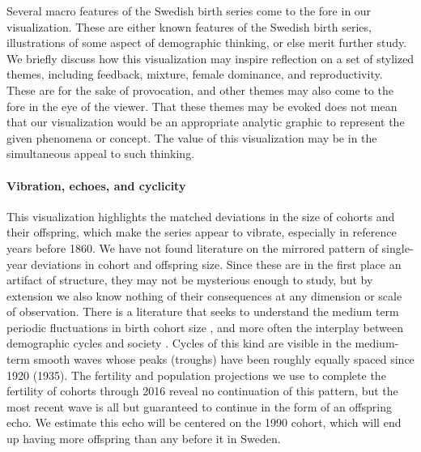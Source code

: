 
Several macro features of the Swedish birth series come to the fore in our visualization. These are either known features of the Swedish birth series, illustrations of some aspect of demographic thinking, or else merit further study. We briefly discuss how this visualization may inspire reflection on a set of stylized themes, including  feedback, mixture, female dominance, and reproductivity. These are for the sake of provocation, and other themes may also come to the fore in the eye of the viewer. That these themes may be evoked does not mean that our visualization would be an appropriate analytic graphic to represent the given phenomena or concept. The value of this visualization may be in the simultaneous appeal to such thinking.

\paragraph{Vibration, echoes, and cyclicity}
This visualization highlights the matched deviations in the size of cohorts and their offspring, which make the series appear to vibrate, especially in reference years before 1860. We have not found literature on the mirrored pattern of single-year deviations in cohort and offspring size. Since these are in the first place an artifact of structure, they may not be mysterious enough to study, but by extension we also know nothing of their consequences at any dimension or scale of observation. There is a literature that seeks to understand the medium term periodic fluctuations in birth cohort size \citep[This literature largely derives from][]{lee1974formal}, and more often the interplay between demographic cycles and society \citep[e.g.,][]{easterlin1987birth}. Cycles of this kind are visible in the medium-term smooth waves whose peaks (troughs) have been roughly equally spaced since 1920 (1935). The fertility and population projections we use to complete the fertility of cohorts through 2016 reveal no continuation of this pattern, but the most recent wave is all but guaranteed to continue in the form of an offspring echo. We estimate this echo will be centered on the 1990 cohort, which will end up having more offspring than any before it in Sweden. 

